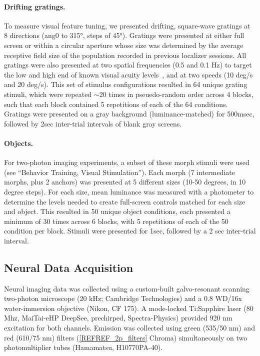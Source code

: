 \paragraph{Drifting gratings.}
To measure visual feature tuning, we presented drifting, square-wave gratings at 8 directions (ang{0} to \ang{315}, steps of \ang{45}). Gratings were presented at either full screen or within a circular aperture whose size was determined by the average receptive field size of the population recorded in previous localizer sessions. All gratings were also presented at two spatial frequencies (0.5 and 0.1 Hz) to target the low and high end of known visual acuity levels~\cite{Prusky2000}, and at two speeds (10 deg/s and 20 deg/s). This set of stimulus configurations resulted in 64 unique grating stimuli, which were repeated $\sim$20 times in pseuedo-random order across 4 blocks, such that each block contained 5 repetitions of each of the 64 conditions. Gratings were presented on a gray background (luminance-matched) for 500msec, followed by 2sec inter-trial intervals of blank gray screens. 

\paragraph{Objects.}
For two-photon imaging experiments, a subset of these morph stimuli were used (see ``Behavior Training, Visual Stimulation''). Each morph (7 intermediate morphs, plus 2 anchors) was presented at 5 different sizes (10-50 degrees, in 10 degree steps). For each size, mean luminance was measured with a photometer to determine the levels needed to create full-screen controls matched for each size and object. This resulted in 50 unique object conditions, each presented a minimum of 30 times across 6 blocks, with 5 repetitions of each of the 50 condition per block. Stimuli were presented for 1sec, followed by a 2 sec inter-trial interval. 


\subsection{Neural Data Acquisition}
Neural imaging data was collected using a custom-built galvo-resonant scanning two-photon microscope (20 kHz; Cambridge Technologies) and a 0.8 WD/16x water-immersion objective (Nikon, CF 175). A mode-locked Ti:Sapphire laser (80 Mhz, MaiTai-eHP DeepSee, prechirped, Spectra-Physics) 
provided 920 nm excitation for both channels. Emission was collected using green (535/50 nm) and red (610/75 nm) filters (\ref{REFREF_2p_filters} Chroma) simultaneously on two photomultiplier tubes (Hamamatsu, H10770PA-40).


